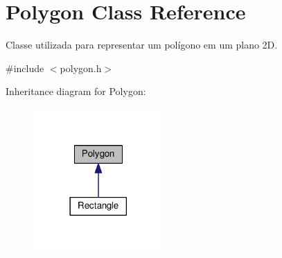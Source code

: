 \hypertarget{class_polygon}{}\section{Polygon Class Reference}
\label{class_polygon}


Classe utilizada para representar um polígono em um plano 2D.  




{\ttfamily \#include $<$polygon.\+h$>$}



Inheritance diagram for Polygon\+:\nopagebreak
\begin{figure}[H]
\begin{center}
\leavevmode
\includegraphics[width=141pt]{class_polygon__inherit__graph}
\end{center}
\end{figure}
